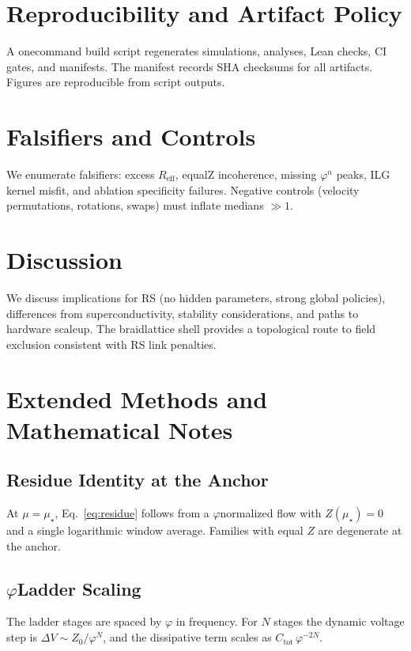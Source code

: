 \documentclass[11pt,a4paper]{article}
\newcommand{\mus}{\mu_{\star}}
\begin{document}
\section{Reproducibility and Artifact Policy}
\label{sec:repro}
A one\textendash command build script regenerates simulations, analyses, Lean checks, CI gates, and manifests. The manifest records SHA checksums for all artifacts. Figures are reproducible from script outputs.

\section{Falsifiers and Controls}
\label{sec:falsifiers}
We enumerate falsifiers: excess \(R_{\mathrm{eff}}\), equal\textendash Z incoherence, missing \(\varphi^n\) peaks, ILG kernel misfit, and ablation specificity failures. Negative controls (velocity permutations, rotations, swaps) must inflate medians \(\gg 1\).

\section{Discussion}
\label{sec:discussion}
We discuss implications for RS (no hidden parameters, strong global policies), differences from superconductivity, stability considerations, and paths to hardware scale\textendash up. The braid\textendash lattice shell provides a topological route to field exclusion consistent with RS link penalties.

\section{Extended Methods and Mathematical Notes}
\label{sec:extended}
\subsection{Residue Identity at the Anchor}
At \(\mu=\mus\), Eq.~\eqref{eq:residue} follows from a \(\varphi\)\textendash normalized flow with \(Z(\mus)=0\) and a single logarithmic window average. Families with equal \(Z\) are degenerate at the anchor.

\subsection{\texorpdfstring{$\varphi$}{phi}\textendash Ladder Scaling}
The ladder stages are spaced by \(\varphi\) in frequency. For \(N\) stages the dynamic voltage step is \(\Delta V\sim Z_0/\varphi^N\), and the dissipative term scales as \(C_{\mathrm{tot}}\,\varphi^{-2N}\).
\end{document}

